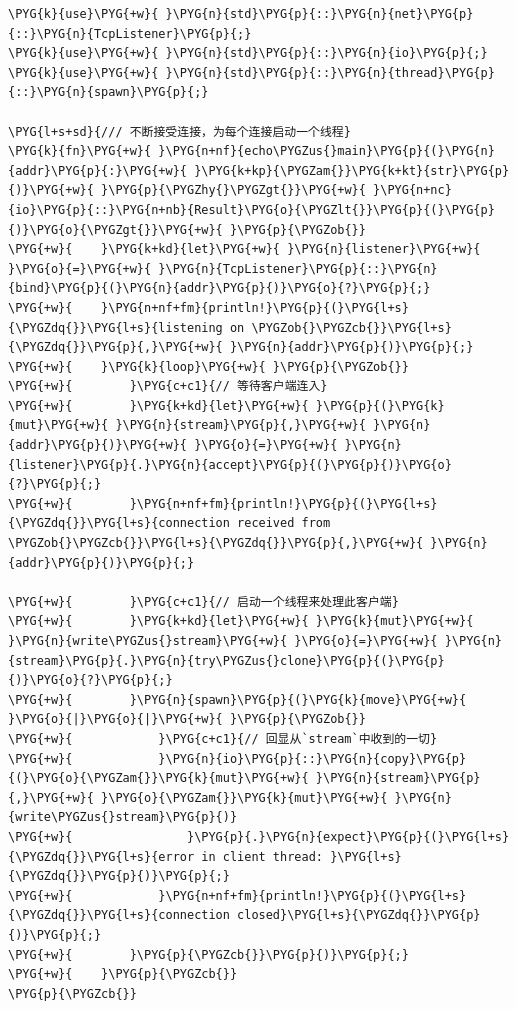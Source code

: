 \begin{Verbatim}[commandchars=\\\{\},breaklines=true,breakanywhere=true,fontsize=\codefont,xleftmargin=17bp]
\PYG{k}{use}\PYG{+w}{ }\PYG{n}{std}\PYG{p}{::}\PYG{n}{net}\PYG{p}{::}\PYG{n}{TcpListener}\PYG{p}{;}
\PYG{k}{use}\PYG{+w}{ }\PYG{n}{std}\PYG{p}{::}\PYG{n}{io}\PYG{p}{;}
\PYG{k}{use}\PYG{+w}{ }\PYG{n}{std}\PYG{p}{::}\PYG{n}{thread}\PYG{p}{::}\PYG{n}{spawn}\PYG{p}{;}

\PYG{l+s+sd}{/// 不断接受连接，为每个连接启动一个线程}
\PYG{k}{fn}\PYG{+w}{ }\PYG{n+nf}{echo\PYGZus{}main}\PYG{p}{(}\PYG{n}{addr}\PYG{p}{:}\PYG{+w}{ }\PYG{k+kp}{\PYGZam{}}\PYG{k+kt}{str}\PYG{p}{)}\PYG{+w}{ }\PYG{p}{\PYGZhy{}\PYGZgt{}}\PYG{+w}{ }\PYG{n+nc}{io}\PYG{p}{::}\PYG{n+nb}{Result}\PYG{o}{\PYGZlt{}}\PYG{p}{(}\PYG{p}{)}\PYG{o}{\PYGZgt{}}\PYG{+w}{ }\PYG{p}{\PYGZob{}}
\PYG{+w}{    }\PYG{k+kd}{let}\PYG{+w}{ }\PYG{n}{listener}\PYG{+w}{ }\PYG{o}{=}\PYG{+w}{ }\PYG{n}{TcpListener}\PYG{p}{::}\PYG{n}{bind}\PYG{p}{(}\PYG{n}{addr}\PYG{p}{)}\PYG{o}{?}\PYG{p}{;}
\PYG{+w}{    }\PYG{n+nf+fm}{println!}\PYG{p}{(}\PYG{l+s}{\PYGZdq{}}\PYG{l+s}{listening on \PYGZob{}\PYGZcb{}}\PYG{l+s}{\PYGZdq{}}\PYG{p}{,}\PYG{+w}{ }\PYG{n}{addr}\PYG{p}{)}\PYG{p}{;}
\PYG{+w}{    }\PYG{k}{loop}\PYG{+w}{ }\PYG{p}{\PYGZob{}}
\PYG{+w}{        }\PYG{c+c1}{// 等待客户端连入}
\PYG{+w}{        }\PYG{k+kd}{let}\PYG{+w}{ }\PYG{p}{(}\PYG{k}{mut}\PYG{+w}{ }\PYG{n}{stream}\PYG{p}{,}\PYG{+w}{ }\PYG{n}{addr}\PYG{p}{)}\PYG{+w}{ }\PYG{o}{=}\PYG{+w}{ }\PYG{n}{listener}\PYG{p}{.}\PYG{n}{accept}\PYG{p}{(}\PYG{p}{)}\PYG{o}{?}\PYG{p}{;}
\PYG{+w}{        }\PYG{n+nf+fm}{println!}\PYG{p}{(}\PYG{l+s}{\PYGZdq{}}\PYG{l+s}{connection received from \PYGZob{}\PYGZcb{}}\PYG{l+s}{\PYGZdq{}}\PYG{p}{,}\PYG{+w}{ }\PYG{n}{addr}\PYG{p}{)}\PYG{p}{;}

\PYG{+w}{        }\PYG{c+c1}{// 启动一个线程来处理此客户端}
\PYG{+w}{        }\PYG{k+kd}{let}\PYG{+w}{ }\PYG{k}{mut}\PYG{+w}{ }\PYG{n}{write\PYGZus{}stream}\PYG{+w}{ }\PYG{o}{=}\PYG{+w}{ }\PYG{n}{stream}\PYG{p}{.}\PYG{n}{try\PYGZus{}clone}\PYG{p}{(}\PYG{p}{)}\PYG{o}{?}\PYG{p}{;}
\PYG{+w}{        }\PYG{n}{spawn}\PYG{p}{(}\PYG{k}{move}\PYG{+w}{ }\PYG{o}{|}\PYG{o}{|}\PYG{+w}{ }\PYG{p}{\PYGZob{}}
\PYG{+w}{            }\PYG{c+c1}{// 回显从`stream`中收到的一切}
\PYG{+w}{            }\PYG{n}{io}\PYG{p}{::}\PYG{n}{copy}\PYG{p}{(}\PYG{o}{\PYGZam{}}\PYG{k}{mut}\PYG{+w}{ }\PYG{n}{stream}\PYG{p}{,}\PYG{+w}{ }\PYG{o}{\PYGZam{}}\PYG{k}{mut}\PYG{+w}{ }\PYG{n}{write\PYGZus{}stream}\PYG{p}{)}
\PYG{+w}{                }\PYG{p}{.}\PYG{n}{expect}\PYG{p}{(}\PYG{l+s}{\PYGZdq{}}\PYG{l+s}{error in client thread: }\PYG{l+s}{\PYGZdq{}}\PYG{p}{)}\PYG{p}{;}
\PYG{+w}{            }\PYG{n+nf+fm}{println!}\PYG{p}{(}\PYG{l+s}{\PYGZdq{}}\PYG{l+s}{connection closed}\PYG{l+s}{\PYGZdq{}}\PYG{p}{)}\PYG{p}{;}
\PYG{+w}{        }\PYG{p}{\PYGZcb{}}\PYG{p}{)}\PYG{p}{;}
\PYG{+w}{    }\PYG{p}{\PYGZcb{}}
\PYG{p}{\PYGZcb{}}


\end{Verbatim}
